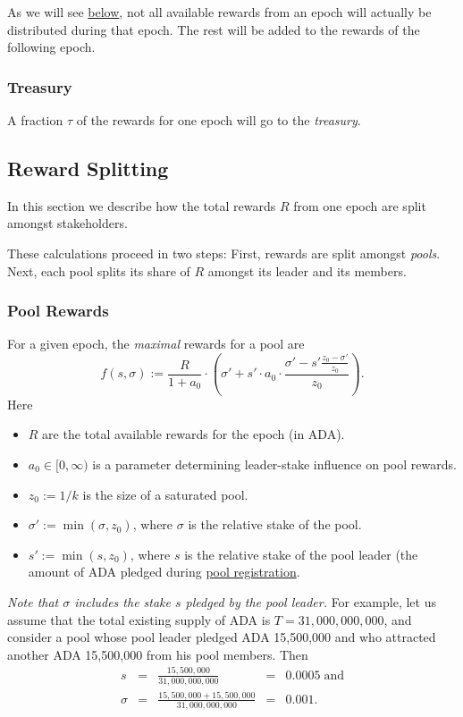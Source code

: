 \documentclass[11pt,a4paper]{article}
\begin{document}
As we will see \hyperref[pool-rewards]{below}, not all available rewards
from an epoch will actually be distributed during that epoch. The rest
will be added to the rewards of the following epoch.

\subsubsection{Treasury}
\label{treasury}

A fraction \(\tau\) of the rewards for one epoch will go to the
\emph{treasury}.

\subsection{Reward Splitting}
\label{reward-splitting}

In this section we describe how the total rewards \(R\) from one epoch
are split amongst stakeholders.

These calculations proceed in two steps: First, rewards are split
amongst \emph{pools}. Next, each pool splits its share of \(R\) amongst
its leader and its members.

\subsubsection{Pool Rewards}
\label{pool-rewards}

For a given epoch, the \emph{maximal} rewards for a pool are \[
    f(s,\sigma) :=
    \frac{R}{1 + a_0}
    \cdot
    \left(\sigma' + s'\cdot a_0\cdot\frac{\sigma' - s'\frac{z_0-\sigma'}{z_0}}{z_0}\right).
\] Here

\begin{itemize}
\item
  \(R\) are the total available rewards for the epoch (in ADA).
\item
  \(a_0\in[0,\infty)\) is a parameter determining leader-stake influence
  on pool rewards.
\item
  \(z_0:=1/k\) is the size of a saturated pool.
\item
  \(\sigma':=\min(\sigma, z_0)\), where \(\sigma\) is the relative stake
  of the pool.
\item
  \(s':=\min(s, z_0)\), where \(s\) is the relative stake of the pool
  leader (the amount of ADA pledged during
  \hyperref[stake-pool-registration]{pool registration}.
\end{itemize}

\emph{Note that \(\sigma\) includes the stake \(s\) pledged by the pool
leader.} For example, let us assume that the total existing supply of
ADA is \(T=31,000,000,000\), and consider a pool whose pool leader
pledged ADA 15,500,000 and who attracted another ADA 15,500,000 from his
pool members. Then \[
\begin{array}{rcccl}
    s                  & = & \displaystyle\frac{15,500,000}{31,000,000,000}              & = & 0.0005\;\text{and} \\[5mm]
    \sigma & = & \displaystyle\frac{15,500,000 + 15,500,000}{31,000,000,000} & = & 0.001. \\
\end{array}
\]
\end{document}
